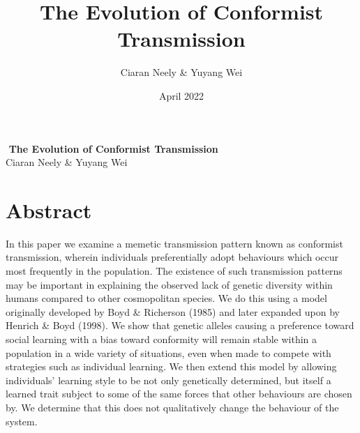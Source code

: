 \documentclass[a4paper,8pt]{extarticle}
\title{The Evolution of Conformist Transmission}
\author{Ciaran Neely \& Yuyang Wei}
\date{April 2022}
\begin{document}
\begin{center}
    $ $
    \vfill
    \Huge{\textbf{The Evolution of Conformist Transmission\\}}
    \vspace{10pt}
    \LARGE{Ciaran Neely \& Yuyang Wei}
    \vfill
\end{center}

\thispagestyle{empty}
\newpage
\tableofcontents
\thispagestyle{empty}
\newpage
{}
\section{Abstract}
In this paper we examine a memetic transmission pattern known as conformist transmission, wherein individuals preferentially adopt behaviours which occur most frequently in the population. The existence of such transmission patterns may be important in explaining the observed lack of genetic diversity within humans compared to other cosmopolitan species. We do this using a model originally developed by Boyd \& Richerson (1985) and later expanded upon by Henrich & Boyd (1998). We show that genetic alleles causing a preference toward social learning with a bias toward conformity will remain stable within a population in a wide variety of situations, even when made to compete with strategies such as individual learning. We then extend this model by allowing individuals' learning style to be not only genetically determined, but itself a learned trait subject to some of the same forces that other behaviours are chosen by. We determine that this does not qualitatively change the behaviour of the system.
\end{document}
